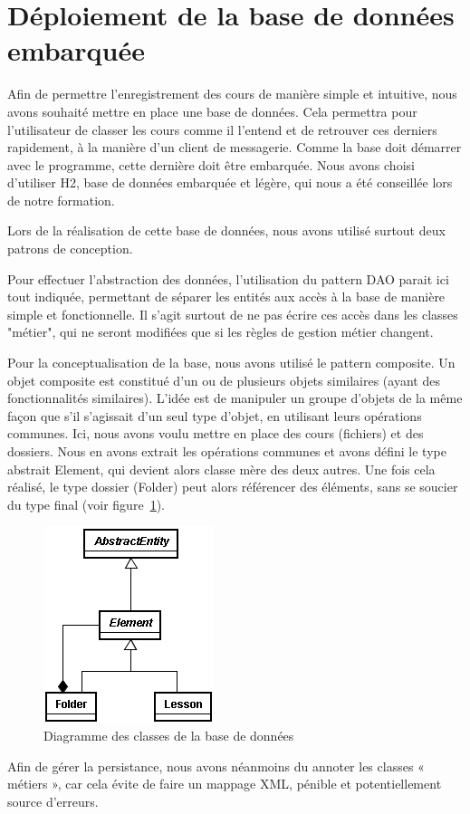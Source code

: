 \section{Déploiement de la base de données embarquée}

Afin de permettre l’enregistrement des cours de manière simple et intuitive, nous avons souhaité mettre en place une base de données. 
Cela permettra pour l’utilisateur de classer les cours comme il l’entend et de retrouver ces derniers rapidement, à la manière d’un client de messagerie.
Comme la base doit démarrer avec le programme, cette dernière doit être embarquée.
Nous avons choisi d’utiliser H2, base de données embarquée et légère, qui nous a été conseillée lors de notre formation.

Lors de la réalisation de cette base de données, nous avons utilisé surtout deux patrons de conception. 

Pour effectuer l’abstraction des données, l’utilisation du pattern DAO parait ici tout indiquée, permettant de séparer les entités aux accès à la base de manière simple et fonctionnelle.
Il s'agit surtout de ne pas écrire ces accès dans les classes "métier", qui ne seront modifiées que si les règles de gestion métier changent.

Pour la conceptualisation de la base, nous avons utilisé le pattern composite.
Un objet composite est constitué d'un ou de plusieurs objets similaires (ayant des fonctionnalités similaires). 
L'idée est de manipuler un groupe d'objets de la même façon que s'il s'agissait d'un seul type d’objet, en utilisant leurs opérations communes.
Ici, nous avons voulu mettre en place des cours (fichiers) et des dossiers.
Nous en avons extrait les opérations communes et avons défini le type abstrait Element, qui devient alors classe mère des deux autres.
Une fois cela réalisé, le type dossier (Folder) peut alors référencer des éléments, sans se soucier du type final  (voir figure~\ref{fig:compositeDiagram}).

\begin{figure}[ht!]
 \centering
 \includegraphics[scale=1,keepaspectratio=true]{./images/CompositeDiagram.png}
 \caption{Diagramme des classes de la base de données}
 \label{fig:compositeDiagram}
\end{figure}

Afin de gérer la persistance, nous avons néanmoins du annoter les classes « métiers », car cela évite de faire un mappage XML, pénible et potentiellement source d’erreurs.

